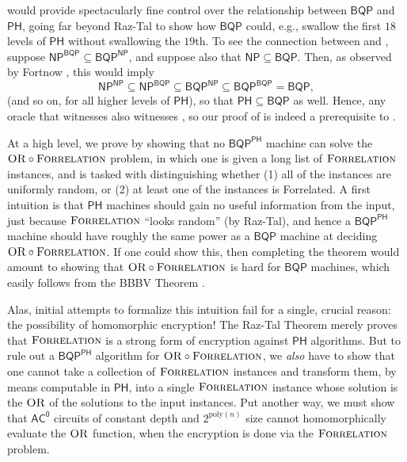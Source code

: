 \documentclass[11pt]{article}%
\newcommand{\poly}{\mathrm{poly}}
\newcommand{\OR}{\normalfont\textsc{OR}}
\newcommand{\Forrelation}{\normalfont\textsc{Forrelation}}
\begin{document}
 would provide spectacularly fine control over the relationship between $\mathsf{BQP}$ and $\mathsf{PH}$, going far beyond Raz-Tal to show how $\mathsf{BQP}$ could, e.g., swallow the first $18$ levels of $\mathsf{PH}$ without swallowing the $19$th.  To see the connection between  and , suppose $\mathsf{NP}^\mathsf{BQP} \subseteq \mathsf{BQP}^\mathsf{NP}$, and suppose also that $\mathsf{NP} \subseteq \mathsf{BQP}$.  Then, as observed by Fortnow \cite{For05}, this would imply
\[
\mathsf{NP}^\mathsf{NP} \subseteq \mathsf{NP}^\mathsf{BQP} \subseteq \mathsf{BQP}^\mathsf{NP} \subseteq \mathsf{BQP}^\mathsf{BQP} = \mathsf{BQP},
\]
(and so on, for all higher levels of $\mathsf{PH}$), so that $\mathsf{PH} \subseteq \mathsf{BQP}$ as well. Hence, any oracle that witnesses  also witnesses , so our proof of  is indeed a prerequisite to .

At a high level, we prove  by showing that no $\mathsf{BQP}^\mathsf{PH}$ machine can solve the $\OR \circ \Forrelation$ problem, in which one is given a long list of $\Forrelation$ instances, and is tasked with distinguishing whether (1) all of the instances are uniformly random, or (2) at least one of the instances is Forrelated. A first intuition is that $\mathsf{PH}$ machines should gain no useful information from the input, just because $\Forrelation$ ``looks random'' (by Raz-Tal), and hence a $\mathsf{BQP}^\mathsf{PH}$ machine should have roughly the same power as a $\mathsf{BQP}$ machine at deciding $\OR \circ \Forrelation$. If one could show this, then completing the theorem would amount to showing that $\OR \circ \Forrelation$ is hard for $\mathsf{BQP}$ machines, which easily follows from the BBBV Theorem \cite{BBBV97}.

Alas, initial attempts to formalize this intuition fail for a single, crucial reason: the possibility of homomorphic encryption! The Raz-Tal Theorem merely proves that $\Forrelation$ is a strong form of encryption against $\mathsf{PH}$ algorithms. But to rule out a $\mathsf{BQP}^\mathsf{PH}$ algorithm for $\OR \circ \Forrelation$, we \textit{also} have to show that one cannot take a collection of $\Forrelation$ instances and transform them, by means computable in $\mathsf{PH}$, into a single $\Forrelation$ instance whose solution is the $\OR$ of the solutions to the input instances. Put another way, we must show that $\mathsf{AC^0}$ circuits of constant depth and $2^{\poly(n)}$ size cannot homomorphically evaluate the $\OR$ function, when the encryption is done via the $\Forrelation$ problem.
\end{document}
